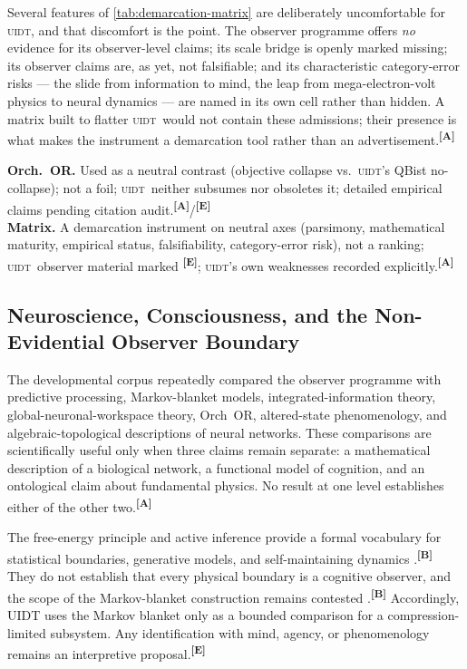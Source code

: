 \documentclass[12pt,a4paper,twoside]{article}
\theoremstyle{plain}
\theoremstyle{definition}
\theoremstyle{remark}
\newcommand{\UIDT}{\textsc{uidt}}
\newcommand{\catmark}[1]{\textsuperscript{\textsf{\textbf{[#1]}}}}
\begin{document}
\noindent Several features of \cref{tab:demarcation-matrix} are deliberately
uncomfortable for \UIDT, and that discomfort is the point. The observer
programme offers \emph{no} evidence for its observer-level claims; its
scale bridge is openly marked missing; its observer claims are, as yet, not
falsifiable; and its characteristic category-error risks --- the slide from
information to mind, the leap from mega-electron-volt physics to neural
dynamics --- are named in its own cell rather than hidden. A matrix built
to flatter \UIDT\ would not contain these admissions; their presence is
what makes the instrument a demarcation tool rather than an
advertisement.\catmark{A}

\begin{evidencebox}{}
\textbf{Orch.\ OR.} Used as a neutral contrast (objective collapse vs.\
\UIDT's QBist no-collapse); not a foil; \UIDT\ neither subsumes nor
obsoletes it; detailed empirical claims pending citation
audit.\catmark{A}/\catmark{E}\\[0.3em]
\textbf{Matrix.} A demarcation instrument on neutral axes (parsimony,
mathematical maturity, empirical status, falsifiability, category-error
risk), not a ranking; \UIDT\ observer material marked \catmark{E}; \UIDT's
own weaknesses recorded explicitly.\catmark{A}
\end{evidencebox}

\subsection{Neuroscience, Consciousness, and the Non-Evidential Observer Boundary}
\label{subsec:ctx-observer-boundary}

The developmental corpus repeatedly compared the observer programme with
predictive processing, Markov-blanket models, integrated-information theory,
global-neuronal-workspace theory, Orch~OR, altered-state phenomenology, and
algebraic-topological descriptions of neural networks. These comparisons are
scientifically useful only when three claims remain separate: a mathematical
description of a biological network, a functional model of cognition, and an
ontological claim about fundamental physics. No result at one level establishes
either of the other two.\catmark{A}

The free-energy principle and active inference provide a formal vocabulary for
statistical boundaries, generative models, and self-maintaining dynamics
\cite{friston2010,kirchhoff2018}.\catmark{B} They do not establish that every
physical boundary is a cognitive observer, and the scope of the Markov-blanket
construction remains contested \cite{raja2021}.\catmark{B} Accordingly, UIDT
uses the Markov blanket only as a bounded comparison for a compression-limited
subsystem. Any identification with mind, agency, or phenomenology remains an
interpretive proposal.\catmark{E}
\end{document}
